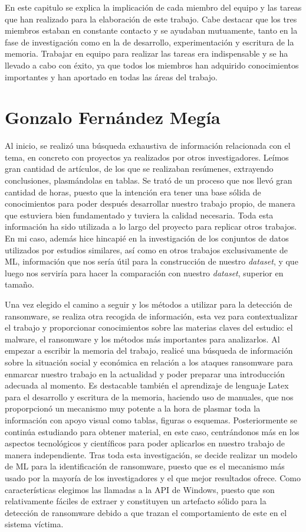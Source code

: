 \noindent En este capitulo se explica la implicación de cada miembro del equipo y las tareas que han realizado para la elaboración de este trabajo. Cabe destacar que los tres miembros estaban en constante contacto y se ayudaban mutuamente, tanto en la fase de investigación como en la de desarrollo, experimentación y escritura de la memoria. Trabajar en equipo para realizar las tareas era indispensable y se ha llevado a cabo con éxito, ya que todos los miembros han adquirido conocimientos importantes y han aportado en todas las áreas del trabajo.


\section{Gonzalo Fernández Megía}
\noindent Al inicio, se realizó una búsqueda exhaustiva de información relacionada con el tema, en concreto con proyectos ya realizados por otros investigadores. Leímos gran cantidad de artículos, de los que se realizaban resúmenes, extrayendo conclusiones, plasmándolas en tablas. Se trató de un proceso que nos llevó gran cantidad de horas, puesto que la intención era tener una base sólida de conocimientos para poder después desarrollar nuestro trabajo propio, de manera que estuviera bien fundamentado y tuviera la calidad necesaria. Toda esta información ha sido utilizada a lo largo del proyecto para replicar otros trabajos. En mi caso, además hice hincapié en la investigación de los conjuntos de datos utilizados por estudios similares, así como en otros trabajos exclusivamente de \gls{ML}, información que nos sería útil para la construcción de nuestro \textit{dataset}, y que luego nos serviría para hacer la comparación con nuestro \textit{dataset}, superior en tamaño.

Una vez elegido el camino a seguir y los métodos a utilizar para la detección de ransomware, se realiza otra recogida de información, esta vez para contextualizar el trabajo y proporcionar conocimientos sobre las materias claves del estudio: el malware, el ransomware y los métodos más importantes para analizarlos. Al empezar a escribir la memoria del trabajo, realicé una búsqueda de información sobre la situación social y económica en relación a los ataques ransomware para enmarcar nuestro trabajo en la actualidad y poder preparar una introducción adecuada al momento. Es destacable también el aprendizaje de lenguaje Latex para el desarrollo y escritura de la memoria, haciendo uso de manuales, que nos proporpcionó un mecanismo muy potente a la hora de plasmar toda la información con apoyo visual como tablas, figuras o esquemas. Posteriormente se continúa estudiando para obtener material, en este caso, centrándonos más en los aspectos tecnológicos y científicos para poder aplicarlos en nuestro trabajo de manera independiente. Tras toda esta investigación, se decide realizar un modelo de \gls{ML} para la identificación de ransomware, puesto que es el mecanismo más usado por la mayoría de los investigadores y el que mejor resultados ofrece. Como características elegimos las llamadas a la \gls{API} de Windows, puesto que son relativamente fáciles de extraer y constituyen un artefacto sólido para la detección de ransomware debido a que trazan el comportamiento de este en el sistema víctima.

